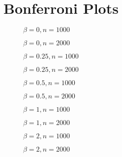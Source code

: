 \section{Bonferroni Plots}

\begin{figure}
  \centering
  
  \caption{$\beta = 0, n = 1000$}
\end{figure}

\begin{figure}
  \centering
  
  \caption{$\beta = 0, n = 2000$}
\end{figure}

\begin{figure}
  \centering
  
  \caption{$\beta = 0.25, n = 1000$}
\end{figure}

\begin{figure}
  \centering
  
  \caption{$\beta = 0.25, n = 2000$}
\end{figure}

\begin{figure}
  \centering
  
  \caption{$\beta = 0.5, n = 1000$}
\end{figure}

\begin{figure}
  \centering
  
  \caption{$\beta = 0.5, n = 2000$}
\end{figure}

\begin{figure}
  \centering
  
  \caption{$\beta = 1, n = 1000$}
\end{figure}

\begin{figure}
  \centering
  
  \caption{$\beta = 1, n = 2000$}
\end{figure}

\begin{figure}
  \centering
  
  \caption{$\beta = 2, n = 1000$}
\end{figure}

\begin{figure}
  \centering
  
  \caption{$\beta = 2, n = 2000$}
\end{figure}
